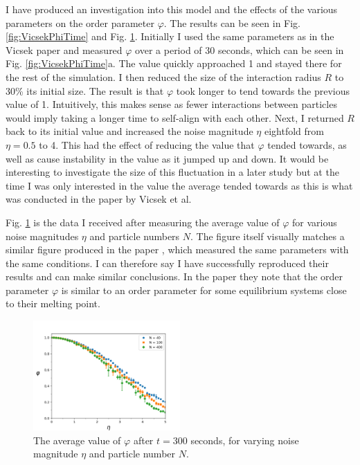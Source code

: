 \documentclass[%
11pt,
amsmath, amssymb,
aps,
pra
]{revtex4-2}
\begin{document}
I have produced an investigation into this model and the effects of the various parameters on the order parameter \(\varphi\).
The results can be seen in Fig. \ref{fig:VicsekPhiTime} and Fig. \ref{fig:VicsekPhiEta}. Initially I used the same 
parameters as in the Vicsek paper and measured \(\varphi\) over a period of 30 seconds, which can be seen in Fig. \ref{fig:VicsekPhiTime}a.
The value quickly approached 1 and stayed there for the rest of the simulation. I then reduced the size of the interaction
radius \(R\) to 30\% its initial size. The result is that \(\varphi\) took longer to tend towards the previous value of 1.
Intuitively, this makes sense as fewer interactions between particles would imply taking a longer time to self-align
with each other. Next, I returned \(R\) back to its initial value and increased the noise magnitude \(\eta\) eightfold
from \(\eta = 0.5\) to 4. This had the effect of reducing the value that \(\varphi\) tended towards, as well as cause instability
in the value as it jumped up and down. It would be interesting to investigate the size of this fluctuation in a later study but
at the time I was only interested in the value the average tended towards as this is what was conducted in the paper by Vicsek et al.

Fig. \ref{fig:VicsekPhiEta} is the data I received after measuring the average value of \(\varphi\) for various 
noise magnitudes \(\eta\) and particle numbers \(N\). The figure itself visually matches a similar figure produced in the paper \cite{vicsek1995novel},
which measured the same parameters with the same conditions. I can therefore say I have successfully reproduced their results
and can make similar conclusions. In the paper they note that the order parameter \(\varphi\) is similar to an order parameter
for some equilibrium systems close to their melting point.
\begin{figure}[tb]
    \includegraphics[width=0.5\textwidth]{figures/vicsek/variationOfMeanVelocityWithNoise.png}
    \caption{The average value of \(\varphi\) after \(t=300\) seconds, for varying noise magnitude \(\eta\) 
    and particle number \(N\).}
    \label{fig:VicsekPhiEta}
\end{figure}
\end{document}
